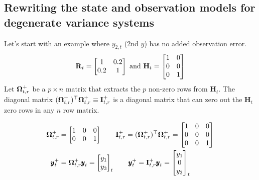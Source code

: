 \documentclass[]{article}
\def\OMG{\mbox{\boldmath $\Omega$}}
\def\HH{\mbox{$\mathbf H$}}	\def\hh{\mbox{$\mathbf h$}}
\def\II{\mbox{$\mathbf I$}} \def\ii{\mbox{$\mathbf i$}}
\def\RR{\mbox{$\mathbf R$}}	 \def\rr{\mbox{$\mathbf r$}}
\begin{document}
\subsection{Rewriting the state and observation models for degenerate variance systems}
Let's start with an example where $y_{2,t}$ (2nd $y$) has no added observation error.
\begin{equation}
\RR_t=\begin{bmatrix}
1&0.2\\
0.2&1
\end{bmatrix}\\
\text{  and  }
\HH_t=\begin{bmatrix}
1&0\\
0&0\\
0&1
\end{bmatrix}
\end{equation}
Let $\OMG_{t,r}^+$ be a $p \times n$  matrix that extracts the $p$ non-zero rows from $\HH_t$. The diagonal matrix $(\OMG_{t,r}^+)^\top\OMG_{t,r}^+ \equiv \II_{t,r}^+$ is a diagonal matrix that can zero out the $\HH_t$ zero rows in any $n$ row matrix.   

\begin{equation}
\begin{split}
\OMG_{t,r}^+ &= 
\begin{bmatrix}
1&0&0\\
0&0&1
\end{bmatrix}\quad\quad
\II_{t,r}^+ = (\OMG_{t,r}^+)^\top\OMG_{t,r}^+ = 
\begin{bmatrix}
1&0&0\\
0&0&0\\
0&0&1
\end{bmatrix}
\\
\yy_t^+&=\OMG_{t,r}^+ \yy_t = 
\begin{bmatrix}
y_1\\
y_3
\end{bmatrix}_t\quad\quad
\yy_t^+=\II_{t,r}^+ \yy_t = \begin{bmatrix}
y_1\\
0\\
y_3
\end{bmatrix}_t
\end{split}
\end{equation}
\end{document}
